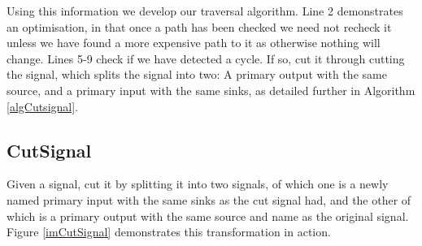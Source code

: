 \documentclass[12pt,final,oneside,a4paper]{dwThesis} %
\begin{document}
   Using this information we develop our traversal
   algorithm.  Line 2 demonstrates an optimisation, in that once a path has
   been checked we need not recheck it unless we have found a more expensive
   path to it as otherwise nothing will change.  Lines 5-9 check if we have
   detected a cycle. If so, cut it through cutting the signal, which splits
   the signal into two: A primary output with the same source, and a primary
   input with the same sinks, as detailed further in Algorithm
   \ref{algCutsignal}.

   \newpage 
   \subsection{CutSignal}
   \label{cutsignal}
   Given a signal, cut it by
   splitting it into two signals, of which one is a newly named primary input
   with the same sinks as the cut signal had, and the other of which is a
   primary output with the same source and name as the original signal.
   Figure \ref{imCutSignal} demonstrates this transformation in action.
\end{document}
